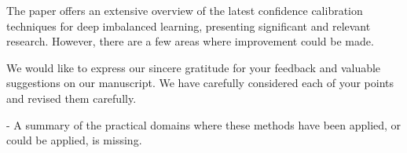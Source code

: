 
\reviewer

\begin{generalcomment}
	The paper offers an extensive overview of the latest confidence calibration techniques for deep imbalanced learning, presenting significant and relevant research. However, there are a few areas where improvement could be made.
\end{generalcomment}
\begin{revmeta}[]
	We would like to express our sincere gratitude for your feedback and valuable suggestions on our manuscript. We have carefully considered each of your points and revised them carefully.
\end{revmeta}

\begin{revcomment}
	- A summary of the practical domains where these methods have been applied, or could be applied, is missing.
\end{revcomment}
